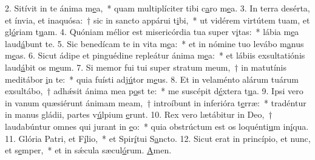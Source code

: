 2. Sitívit in te ánima m\uline{e}a,~* quam multiplíciter tibi c\uline{a}ro m\uline{e}a.
3. In terra desérta, et ínvia, et inaquósa:~† sic in sancto appárui t\uline{i}bi,~* ut vidérem virtútem tuam, et gl\uline{ó}riam t\uline{u}am.
4. Quóniam mélior est misericórdia tua super v\uline{i}tas:~* lábia m\uline{e}a laud\uline{á}bunt te.
5. Sic benedícam te in vita m\uline{e}a:~* et in nómine tuo levábo m\uline{a}nus m\uline{e}as.
6. Sicut ádipe et pinguédine repleátur ánima m\uline{e}a:~* et lábiis exsultatiónis laud\uline{á}bit os m\uline{e}um.
7. Si memor fui tui super stratum meum,~† in matutínis meditábor \uline{i}n te:~* quia fuísti adj\uline{ú}tor m\uline{e}us.
8. Et in velaménto alárum tuárum exsultábo,~† adhǽsit ánima mea p\uline{o}st te:~* me suscépit d\uline{é}xtera t\uline{u}a.
9. Ipsi vero in vanum quæsiérunt ánimam meam,~† introíbunt in inferióra t\uline{e}rræ:~* tradéntur in manus gládii, partes v\uline{ú}lpium \uline{e}runt.
10. Rex vero lætábitur in Deo,~† laudabúntur omnes qui jurant in \uline{e}o:~* quia obstrúctum est os loquénti\uline{u}m in\uline{í}qua.
11. Glória Patri, et F\uline{í}lio,~* et Spir\uline{í}tui S\uline{a}ncto.
12. Sicut erat in princípio, et nunc, et s\uline{e}mper,~* et in sǽcula sæcul\uline{ó}rum. \uline{A}men.
